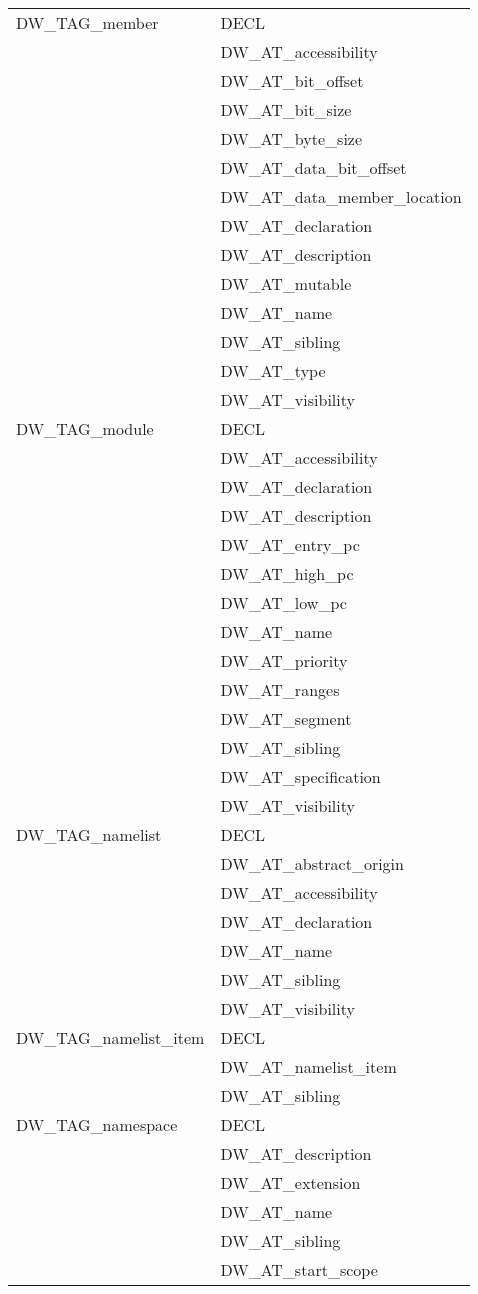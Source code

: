 \begin{longtable}{l|p{8cm}}
DW\_TAG\_member
&DECL \\
&DW\_AT\_accessibility \\
&DW\_AT\_bit\_offset \\
&DW\_AT\_bit\_size \\
&DW\_AT\_byte\_size \\
&DW\_AT\_data\_bit\_offset \\
&DW\_AT\_data\_member\_location \\
&DW\_AT\_declaration \\
&DW\_AT\_description \\
&DW\_AT\_mutable \\
&DW\_AT\_name \\
&DW\_AT\_sibling \\
&DW\_AT\_type \\
&DW\_AT\_visibility \\


DW\_TAG\_module
&DECL \\
&DW\_AT\_accessibility \\
&DW\_AT\_declaration \\
&DW\_AT\_description \\
&DW\_AT\_entry\_pc \\
&DW\_AT\_high\_pc \\
&DW\_AT\_low\_pc \\
&DW\_AT\_name \\
&DW\_AT\_priority \\
&DW\_AT\_ranges \\
&DW\_AT\_segment \\
&DW\_AT\_sibling \\
&DW\_AT\_specification \\
&DW\_AT\_visibility \\

DW\_TAG\_namelist
&DECL \\
&DW\_AT\_abstract\_origin \\
&DW\_AT\_accessibility \\
&DW\_AT\_declaration \\
&DW\_AT\_name \\
&DW\_AT\_sibling \\
&DW\_AT\_visibility \\

DW\_TAG\_namelist\_item
&DECL \\
&DW\_AT\_namelist\_item \\
&DW\_AT\_sibling \\

DW\_TAG\_namespace
&DECL \\
&DW\_AT\_description \\
&DW\_AT\_extension \\
&DW\_AT\_name \\
&DW\_AT\_sibling \\
&DW\_AT\_start\_scope \\


\end{longtable}
